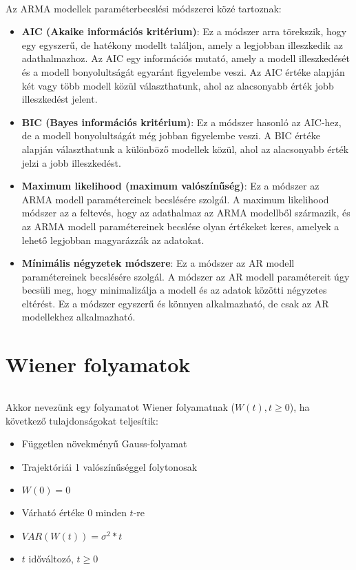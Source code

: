\documentclass[11pt,a4pape,draftr]{article}
\begin{document}
					\paragraph{}
						Az ARMA modellek paraméterbecslési módszerei közé tartoznak:
						\begin{itemize}
							\item \textbf{AIC (Akaike információs kritérium)}: Ez a módszer arra törekszik, hogy egy egyszerű, de hatékony modellt találjon, amely a legjobban illeszkedik az adathalmazhoz. Az AIC egy információs mutató, amely a modell illeszkedését és a modell bonyolultságát egyaránt figyelembe veszi. Az AIC értéke alapján két vagy több modell közül választhatunk, ahol az alacsonyabb érték jobb illeszkedést jelent.
							\item \textbf{BIC (Bayes információs kritérium)}: Ez a módszer hasonló az AIC-hez, de a modell bonyolultságát még jobban figyelembe veszi. A BIC értéke alapján választhatunk a különböző modellek közül, ahol az alacsonyabb érték jelzi a jobb illeszkedést.
							
							\item \textbf{Maximum likelihood (maximum valószínűség)}: Ez a módszer az ARMA modell paramétereinek becslésére szolgál. A maximum likelihood módszer az a feltevés, hogy az adathalmaz az ARMA modellből származik, és az ARMA modell paramétereinek becslése olyan értékeket keres, amelyek a lehető legjobban magyarázzák az adatokat.
							
							\item \textbf{Mínimális négyzetek módszere}: Ez a módszer az AR modell paramétereinek becslésére szolgál. A módszer az AR modell paramétereit úgy becsüli meg, hogy minimalizálja a modell és az adatok közötti négyzetes eltérést. Ez a módszer egyszerű és könnyen alkalmazható, de csak az AR modellekhez alkalmazható.

					\end{itemize}
		\part{Wiener folyamatok}
			\paragraph{}
				Akkor nevezünk egy folyamatot Wiener folyamatnak ($W(t), t\ge 0$), ha következő tulajdonságokat teljesítik:
				\begin{itemize}
					\item Független növekményű Gauss-folyamat
					\item Trajektóriái 1 valószínűséggel folytonosak
					\item $W(0) = 0$
					\item Várható értéke 0 minden $t$-re
					\item $VAR(W(t)) = \sigma^2 * t$
					\item $t$ időváltozó, $t \ge 0$
				\end{itemize}
\end{document}
